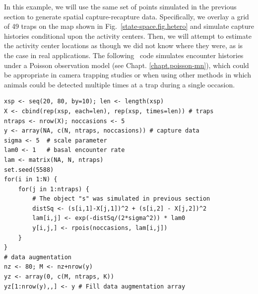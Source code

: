 In this example, we will use the same set of points simulated in the
previous section to generate spatial capture-recapture
data. Specifically, we overlay a grid of 49
traps on the map shown in Fig.~\ref{state-space.fig.hetero} and
simulate capture histories conditional upon the activity
centers. Then, we will attempt to estimate the activity center
locations as though we did not know where they were, as is the case in
real applications. The following \R~code simulates encounter histories under a
Poisson observation model (see Chapt. \ref{chapt.poisson-mn}), which could be appropriate in camera
trapping studies or when using other methods in which animals could
be detected multiple times at a trap during a single occasion.

\begin{samepage}
\begin{small}
\begin{verbatim}
xsp <- seq(20, 80, by=10); len <- length(xsp)
X <- cbind(rep(xsp, each=len), rep(xsp, times=len)) # traps
ntraps <- nrow(X); noccasions <- 5
y <- array(NA, c(N, ntraps, noccasions)) # capture data
sigma <- 5  # scale parameter
lam0 <- 1   # basal encounter rate
lam <- matrix(NA, N, ntraps)
set.seed(5588)
for(i in 1:N) {
    for(j in 1:ntraps) {
        # The object "s" was simulated in previous section
        distSq <- (s[i,1]-X[j,1])^2 + (s[i,2] - X[j,2])^2
        lam[i,j] <- exp(-distSq/(2*sigma^2)) * lam0
        y[i,j,] <- rpois(noccasions, lam[i,j])
    }
}
# data augmentation
nz <- 80; M <- nz+nrow(y)
yz <- array(0, c(M, ntraps, K))
yz[1:nrow(y),,] <- y # Fill data augmentation array
\end{verbatim}
\end{small}
\end{samepage}

